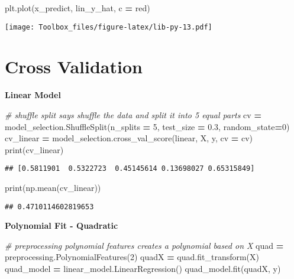 \documentclass[
]{book}
\newenvironment{Shaded}{\begin{snugshade}}{\end{snugshade}}
\newcommand{\BuiltInTok}[1]{#1}
\newcommand{\CommentTok}[1]{\textcolor[rgb]{0.56,0.35,0.01}{\textit{#1}}}
\newcommand{\DecValTok}[1]{\textcolor[rgb]{0.00,0.00,0.81}{#1}}
\newcommand{\FloatTok}[1]{\textcolor[rgb]{0.00,0.00,0.81}{#1}}
\newcommand{\NormalTok}[1]{#1}
\newcommand{\OperatorTok}[1]{\textcolor[rgb]{0.81,0.36,0.00}{\textbf{#1}}}
\newcommand{\StringTok}[1]{\textcolor[rgb]{0.31,0.60,0.02}{#1}}
\begin{document}
\begin{Shaded}
\begin{Highlighting}[]
\NormalTok{plt.plot(x\_predict, lin\_y\_hat, c }\OperatorTok{=} \StringTok{\textquotesingle{}red\textquotesingle{}}\NormalTok{)}
\end{Highlighting}
\end{Shaded}

\texttt{[image: Toolbox\_files/figure-latex/lib-py-13.pdf]}

\hypertarget{cross-validation}{%
\section{Cross Validation}\label{cross-validation}}

\textbf{Linear Model}

\begin{Shaded}
\begin{Highlighting}[]
\CommentTok{\# shuffle split says \textquotesingle{}shuffle the data\textquotesingle{} and split it into 5 equal parts}
\NormalTok{cv }\OperatorTok{=}\NormalTok{ model\_selection.ShuffleSplit(n\_splits }\OperatorTok{=} \DecValTok{5}\NormalTok{, test\_size }\OperatorTok{=} \FloatTok{0.3}\NormalTok{, random\_state}\OperatorTok{=}\DecValTok{0}\NormalTok{)}
\NormalTok{cv\_linear }\OperatorTok{=}\NormalTok{ model\_selection.cross\_val\_score(linear, X, y, cv }\OperatorTok{=}\NormalTok{ cv)}
\BuiltInTok{print}\NormalTok{(cv\_linear)}
\end{Highlighting}
\end{Shaded}

\begin{verbatim}
## [0.5811901  0.5322723  0.45145614 0.13698027 0.65315849]
\end{verbatim}

\begin{Shaded}
\begin{Highlighting}[]
\BuiltInTok{print}\NormalTok{(np.mean(cv\_linear))}
\end{Highlighting}
\end{Shaded}

\begin{verbatim}
## 0.4710114602819653
\end{verbatim}

\textbf{Polynomial Fit - Quadratic}

\begin{Shaded}
\begin{Highlighting}[]
\CommentTok{\# preprocessing polynomial features creates a polynomial based on X}
\NormalTok{quad }\OperatorTok{=}\NormalTok{ preprocessing.PolynomialFeatures(}\DecValTok{2}\NormalTok{)}
\NormalTok{quadX }\OperatorTok{=}\NormalTok{ quad.fit\_transform(X)}
\NormalTok{quad\_model }\OperatorTok{=}\NormalTok{ linear\_model.LinearRegression()}
\NormalTok{quad\_model.fit(quadX, y)}
\end{Highlighting}
\end{Shaded}
\end{document}
